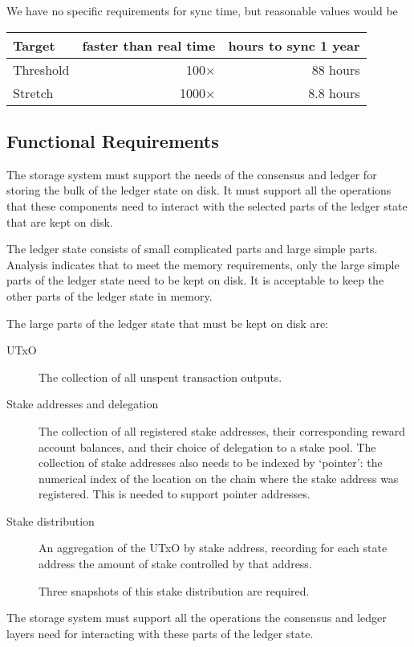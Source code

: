 \documentclass[11pt,a4paper]{article}
\begin{document}
We have no specific requirements for sync time, but reasonable values would be
\begin{center}
\begin{tabular}[]{lrr}
  Target    & faster than real time & hours to sync 1 year \\
  \toprule
  Threshold &  100$\times$ &  88 hours \\
  Stretch   & 1000$\times$ & 8.8 hours
\end{tabular}
\end{center}


\subsection{Functional Requirements}
\label{functional-requirements}

The storage system must support the needs of the consensus and ledger for
storing the bulk of the ledger state on disk. It must support all the operations
that these components need to interact with the selected parts of the ledger
state that are kept on disk.

The ledger state consists of small complicated parts and large simple parts.
Analysis indicates that to meet the memory requirements, only the large simple
parts of the ledger state need to be kept on disk. It is acceptable to keep the
other parts of the ledger state in memory.

The large parts of the ledger state that must be kept on disk are:
\begin{description}
\item[UTxO]
    The collection of all unspent transaction outputs.
\item[Stake addresses and delegation]
    The collection of all registered stake addresses, their corresponding
    reward account balances, and their choice of delegation to a stake pool.
    The collection of stake addresses also needs to be indexed by `pointer':
    the numerical index of the location on the chain where the stake address
    was registered. This is needed to support pointer addresses.
\item[Stake distribution]
    An aggregation of the UTxO by stake address, recording for each state
    address the amount of stake controlled by that address.

    Three snapshots of this stake distribution are required.
\end{description}
The storage system must support all the operations the consensus and ledger
layers need for interacting with these parts of the ledger state.
\end{document}
